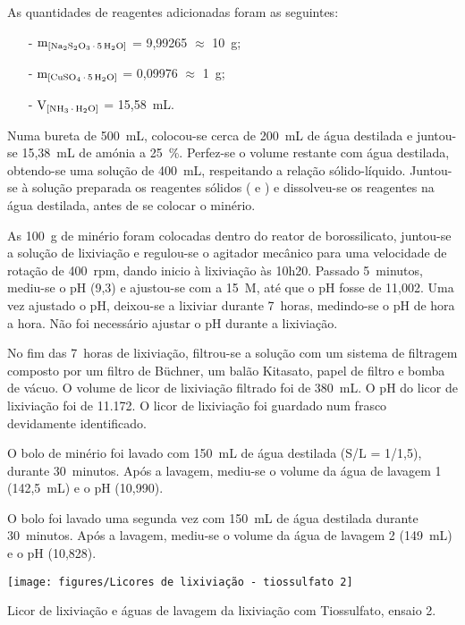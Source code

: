 As quantidades de reagentes adicionadas foram as seguintes:

\begin{itemize}
	\item[-] $\mathrm{m}_{\left[\tsp{}\right]}$ = 9,99265 $\approx$ 10~g;
	\item[-] $\mathrm{m}_{\left[\sulfcu{}\right]}$ = 0,09976 $\approx$ 1~g;
	\item[-] $\mathrm{V}_{\left[\amo{}\right]}$ = 15,58~mL.
\end{itemize}

Numa bureta de 500~mL, colocou-se cerca de 200~mL de água destilada e juntou-se 15,38~mL de amónia a 25~\%.
Perfez-se o volume restante com água destilada, obtendo-se uma solução de 400~mL, respeitando a relação sólido-líquido.
Juntou-se à solução preparada os reagentes sólidos (\tsp{} e \sulfcu{}) e dissolveu-se os reagentes na água destilada, antes de se colocar o minério.

As 100~g de minério foram colocadas dentro do reator de borossilicato, juntou-se a solução de lixiviação e regulou-se o agitador mecânico para uma velocidade de rotação de 400~rpm, dando inicio à lixiviação às 10h20.
Passado 5~minutos, mediu-se o pH (9,3) e ajustou-se com \hidso{} a 15~M, até que o pH fosse de 11,002.
Uma vez ajustado o pH, deixou-se a lixiviar durante 7~horas, medindo-se o pH de hora a hora.
Não foi necessário ajustar o pH durante a lixiviação.

No fim das 7~horas de lixiviação, filtrou-se a solução com um sistema de filtragem composto por um filtro de Büchner, um balão Kitasato, papel de filtro e bomba de vácuo.
O volume de licor de lixiviação filtrado foi de 380~mL.
O pH do licor de lixiviação foi de 11.172.
O licor de lixiviação foi guardado num frasco devidamente identificado.

O bolo de minério foi lavado com 150~mL de água destilada (S/L = 1/1,5), durante 30~minutos.
Após a lavagem, mediu-se o volume da água de lavagem 1 (142,5~mL) e o pH (10,990).

O bolo foi lavado uma segunda vez com 150~mL de água destilada durante 30~minutos.
Após a lavagem, mediu-se o volume da água de lavagem 2 (149~mL) e o pH (10,828).

\begin{marginfigure}
	\centering
	\texttt{[image: figures/Licores de lixiviação - tiossulfato 2]}
	\caption{Licor de lixiviação e águas de lavagem da lixiviação com Tiossulfato, ensaio 2.}
	\label{fig:licores-lix-tiossulfato2}
\end{marginfigure}

